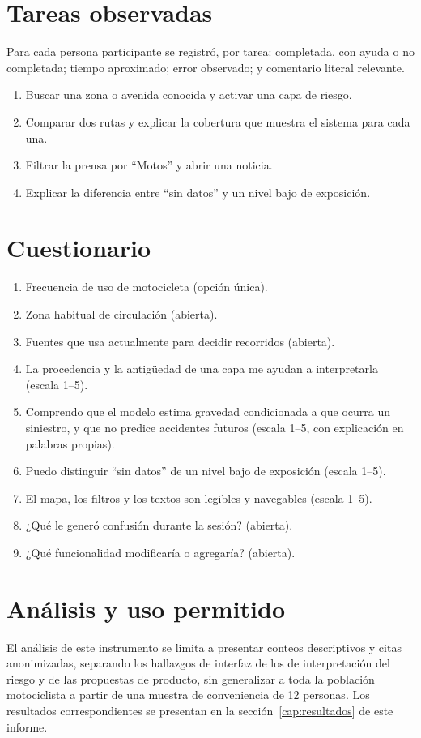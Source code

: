 \section{Tareas observadas}

Para cada persona participante se registró, por tarea: completada, con
ayuda o no completada; tiempo aproximado; error observado; y comentario
literal relevante.

\begin{enumerate}
    \item Buscar una zona o avenida conocida y activar una capa de riesgo.
    \item Comparar dos rutas y explicar la cobertura que muestra el sistema para cada una.
    \item Filtrar la prensa por ``Motos'' y abrir una noticia.
    \item Explicar la diferencia entre ``sin datos'' y un nivel bajo de exposición.
\end{enumerate}

\section{Cuestionario}

\begin{enumerate}
    \item Frecuencia de uso de motocicleta (opción única).
    \item Zona habitual de circulación (abierta).
    \item Fuentes que usa actualmente para decidir recorridos (abierta).
    \item La procedencia y la antigüedad de una capa me ayudan a interpretarla (escala 1--5).
    \item Comprendo que el modelo estima gravedad condicionada a que ocurra un siniestro, y que no predice accidentes futuros (escala 1--5, con explicación en palabras propias).
    \item Puedo distinguir ``sin datos'' de un nivel bajo de exposición (escala 1--5).
    \item El mapa, los filtros y los textos son legibles y navegables (escala 1--5).
    \item ¿Qué le generó confusión durante la sesión? (abierta).
    \item ¿Qué funcionalidad modificaría o agregaría? (abierta).
\end{enumerate}

\section{Análisis y uso permitido}

El análisis de este instrumento se limita a presentar conteos
descriptivos y citas anonimizadas, separando los hallazgos de interfaz
de los de interpretación del riesgo y de las propuestas de producto, sin
generalizar a toda la población motociclista a partir de una muestra de
conveniencia de 12 personas. Los resultados correspondientes se
presentan en la sección~\ref{cap:resultados} de este informe.

